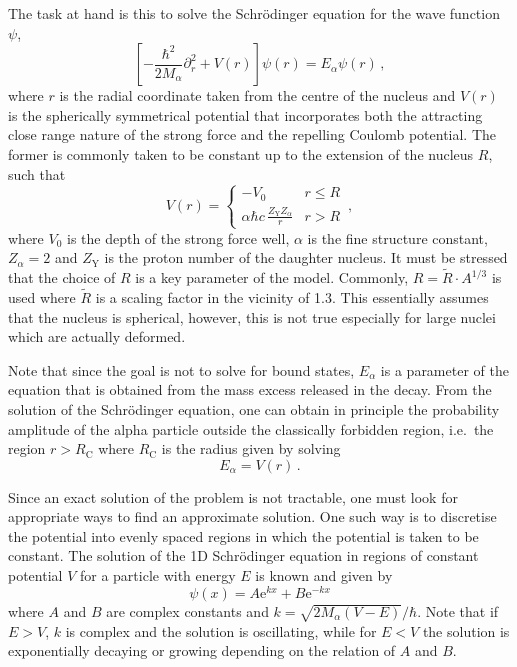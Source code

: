 \documentclass[a4paper,DIV=12,english]{scrartcl}
\begin{document}
The task at hand is this to solve the Schrödinger equation for the wave function $\psi$,
\begin{equation}
    \left[-\frac{\hbar^2}{2M_\alpha} \partial_r^2 + V(r)\right] \psi(r) = E_\alpha \psi(r)\,,
\end{equation}
where $r$ is the radial coordinate taken from the centre of the nucleus and $V(r)$ is the spherically symmetrical potential that incorporates both the attracting close range nature of the strong force and the repelling Coulomb potential. The former is commonly taken to be constant up to the extension of the nucleus $R$, such that
\begin{equation}
    V(r) =  \begin{cases}
                - V_0 & r \leq R\\
                \alpha \hbar c\, \frac{Z_\text{Y}Z_\alpha}{r} & r > R
            \end{cases}\,,
\end{equation}
where $V_0$ is the depth of the strong force well, $\alpha$ is the fine structure constant, $Z_\alpha=2$ and $Z_\text{Y}$ is the proton number of the daughter nucleus. It must be stressed that the choice of $R$ is a key parameter of the model. Commonly, $R = \tilde R \cdot A^{1/3}$ is used where $\tilde R$ is a scaling factor in the vicinity of 1.3. This essentially assumes that the nucleus is spherical, however, this is not true especially for large nuclei which are actually deformed.

Note that since the goal is not to solve for bound states, $E_\alpha$ is a parameter of the equation that is obtained from the mass excess released in the decay. From the solution of the Schrödinger equation, one can obtain in principle the probability amplitude of the alpha particle outside the classically forbidden region, i.e.\ the region $r > R_\text{C}$ where $R_\text{C}$ is the radius given by solving
\begin{equation}
    E_\alpha = V(r)\,.
\end{equation}

Since an exact solution of the problem is not tractable, one must look for appropriate ways to find an approximate solution. One such way is to discretise the potential into evenly spaced regions in which the potential is taken to be constant. The solution of the 1D Schrödinger equation in regions of constant potential $V$ for a particle with energy $E$ is known and given by
\begin{equation}
    \psi(x) = A \text{e}^{kx} + B \text{e}^{-kx}
\end{equation}
where $A$ and $B$ are complex constants and $k=\sqrt{2M_\alpha(V-E)}/\hbar$. Note that if $E>V$, $k$ is complex and the solution is oscillating, while for $E<V$ the solution is exponentially decaying or growing depending on the relation of $A$ and $B$.
\end{document}

